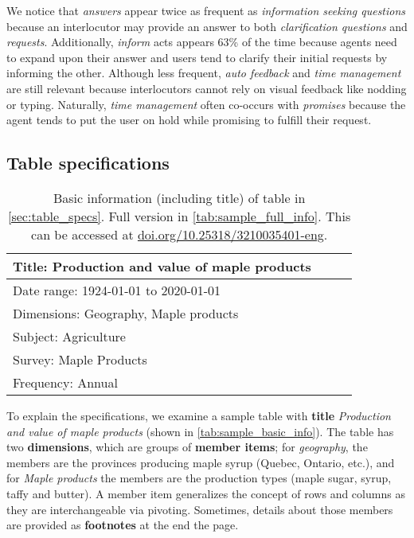 \documentclass[11pt]{article}
\begin{document}
We notice that \textit{answers} appear twice as frequent as \textit{information seeking questions} because an interlocutor may provide an answer to both \textit{clarification questions} and \textit{requests}. Additionally, \textit{inform} acts appears 63\% of the time because agents need to expand upon their answer and users tend to clarify their initial requests by informing the other. Although less frequent, \textit{auto feedback} and \textit{time management} are still relevant because interlocutors cannot rely on visual feedback like nodding or typing. Naturally, \textit{time management} often co-occurs with \textit{promises} because the agent tends to put the user on hold while promising to fulfill their request.





\subsection{Table specifications}
\label{sec:table_specs}
\begin{table}[t]
    \small
    \centering
    \begin{tabular}{p{0.9\linewidth}}

\toprule
Title: Production and value of maple products\\
\midrule
Date range: 1924-01-01 to 2020-01-01\\
Dimensions: Geography, Maple products\\
Subject: Agriculture\\
Survey: Maple Products\\
Frequency: Annual\\
\bottomrule
    \end{tabular}
    \caption{Basic information (including title) of table in \autoref{sec:table_specs}. Full version in \autoref{tab:sample_full_info}. This can be accessed at \href{https://doi.org/10.25318/3210035401-eng}{doi.org/10.25318/3210035401-eng}.}
    \label{tab:sample_basic_info}
\end{table}

To explain the specifications, we examine a sample table with \textbf{title} \emph{Production and value of maple products} (shown in \autoref{tab:sample_basic_info}). The table has two \textbf{dimensions}, which are groups of \textbf{member items}; for \textit{geography}, the members are the provinces producing maple syrup (Quebec, Ontario, etc.), and for \textit{Maple products} the members are the production types (maple sugar, syrup, taffy and butter). A member item generalizes the concept of rows and columns as they are interchangeable via pivoting. Sometimes, details about those members are provided as \textbf{footnotes} at the end the page.
\end{document}
